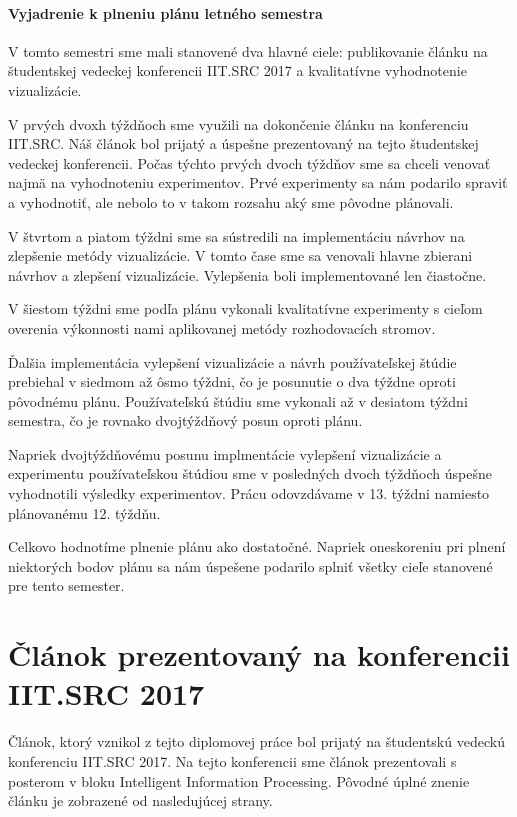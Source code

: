 \paragraph{Vyjadrenie k plneniu plánu letného semestra} V tomto semestri sme mali stanovené dva hlavné ciele: publikovanie článku na študentskej vedeckej konferencii IIT.SRC 2017 a kvalitatívne vyhodnotenie vizualizácie. 
\par
V prvých dvoxh týždňoch sme využili na dokončenie článku na konferenciu IIT.SRC. Náš článok bol prijatý a úspešne prezentovaný na tejto študentskej vedeckej konferencii. Počas týchto prvých dvoch týždňov sme sa chceli venovať najmä na vyhodnoteniu experimentov. Prvé experimenty sa nám podarilo spraviť a vyhodnotiť, ale nebolo to v takom rozsahu aký sme pôvodne plánovali.
\par
V štvrtom a piatom týždni sme sa sústredili na implementáciu návrhov na zlepšenie metódy vizualizácie. V tomto čase sme sa venovali hlavne zbierani návrhov a zlepšení vizualizácie. Vylepšenia boli implementované len čiastočne.
\par
V šiestom týždni sme podľa plánu vykonali kvalitatívne experimenty s cieľom overenia výkonnosti nami aplikovanej metódy rozhodovacích stromov.
\par
Ďalšia implementácia vylepšení vizualizácie a návrh používateľskej štúdie prebiehal v siedmom až ôsmo týždni, čo je posunutie o dva týždne oproti pôvodnému plánu. Používateľskú štúdiu sme vykonali až v desiatom týždni semestra, čo je rovnako dvojtýždňový posun oproti plánu.
\par
Napriek dvojtýždňovému posunu implmentácie vylepšení vizualizácie a experimentu používateľskou štúdiou sme v posledných dvoch týždňoch úspešne vyhodnotili výsledky experimentov. Prácu odovzdávame v 13. týždni namiesto plánovanému 12. týždňu.
\par
Celkovo hodnotíme plnenie plánu ako dostatočné. Napriek oneskoreniu pri plnení niektorých bodov plánu sa nám úspešene podarilo splniť všetky cieľe stanovené pre tento semester.

\newpage

\section{Článok prezentovaný na konferencii IIT.SRC 2017}
Článok, ktorý vznikol z tejto diplomovej práce bol prijatý na študentskú vedeckú konferenciu IIT.SRC 2017. Na tejto konferencii sme článok prezentovali s posterom v bloku Intelligent Information Processing. Pôvodné úplné znenie článku je zobrazené od nasledujúcej strany.











